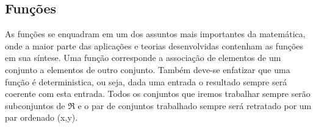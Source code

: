 \documentclass[a4paper,12pt,twoside,BCOR=10mm]{scrbook}
\begin{document}
\begin{titlepage}


\chapter{Funções}
As funções se enquadram em um dos assuntos mais importantes da matemática, onde a maior parte das aplicações e teorias desenvolvidas contenham as funções em sua síntese. Uma função corresponde a associação de elementos de um conjunto a elementos de outro conjunto. Também deve-se enfatizar que uma função é deterministica, ou seja, dada uma entrada o resultado sempre será coerente com esta entrada. Todos os conjuntos que iremos trabalhar sempre serão subconjuntos de $\Re$ e o par de conjuntos trabalhado sempre será retratado por um par ordenado (x,y).


\end{titlepage}
\end{document}
